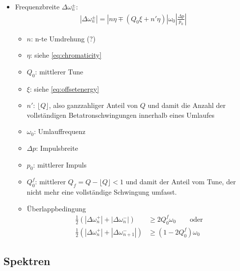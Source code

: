 \documentclass[12pt]{article}%
\newcommand{\itemf}{\item[$\circ$]}
\begin{document}
\begin{itemize}
\begin{itemize}
	\end{itemize}

\item Frequenzbreite $\Delta \omega_n^\pm$:
\begin{align}
	|\Delta \omega_n^\pm| = | n \eta \mp (Q_0 \xi + n' \eta)| \omega_0 \left| \frac{\Delta p}{p_0} \right|
\end{align}
\begin{itemize}
	\item $n$: n-te Umdrehung (?)
	\item $\eta$: siehe \eqref{eq:chromaticity}
	\item $Q_0$: mittlerer Tune
	\item $\xi$: siehe \eqref{eq:offsetenergy}
	\item $n'$: $\lfloor Q \rfloor$, also ganzzahliger Anteil von $Q$ und damit die Anzahl der vollständigen Betatronschwingungen innerhalb eines Umlaufes
	\item $\omega_0$: Umlauffrequenz
	\item $\Delta p$: Impulsbreite
	\item $p_0$: mittlerer Impuls
	\item $Q_0^f$: mittlerer $Q_f = Q - \lfloor Q \rfloor < 1$ und damit der Anteil vom Tune, der nicht mehr eine vollständige Schwingung umfasst.
\end{itemize}
\begin{itemize}
	\itemf Überlappbedingung
	\begin{subequations}
	\begin{align}
	\frac{1}{2} \left( | \Delta \omega_n^+| + | \Delta \omega_n^-| \right) &\ge 2 Q_0^f \omega_0  \qquad \text{oder} \\
	\frac{1}{2} \left(|\Delta \omega_n^+| + |\Delta \omega_{n+1}^-| \right) &\ge (1 - 2 Q_0^f)\omega_0
	\end{align}
	\end{subequations}
\end{itemize}

\end{itemize}

\subsection{Spektren}
\end{document}
